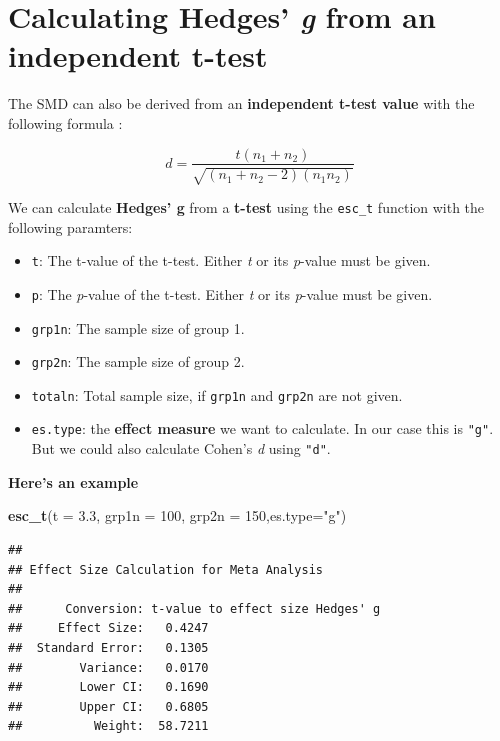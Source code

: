 \documentclass[]{book}
\newenvironment{Shaded}{\begin{snugshade}}{\end{snugshade}}
\newcommand{\DataTypeTok}[1]{\textcolor[rgb]{0.13,0.29,0.53}{#1}}
\newcommand{\DecValTok}[1]{\textcolor[rgb]{0.00,0.00,0.81}{#1}}
\newcommand{\FloatTok}[1]{\textcolor[rgb]{0.00,0.00,0.81}{#1}}
\newcommand{\KeywordTok}[1]{\textcolor[rgb]{0.13,0.29,0.53}{\textbf{#1}}}
\newcommand{\NormalTok}[1]{#1}
\newcommand{\StringTok}[1]{\textcolor[rgb]{0.31,0.60,0.02}{#1}}
\providecommand{\tightlist}{%
  \setlength{\itemsep}{0pt}\setlength{\parskip}{0pt}}
\begin{document}
\hypertarget{g}{%
\section{\texorpdfstring{Calculating Hedges' \emph{g} from an independent t-test}{Calculating Hedges' g from an independent t-test}}\label{g}}

The SMD can also be derived from an \textbf{independent t-test value} with the following formula \citep{thalheimer2002calculate}:

\[d = \frac {t(n_1+n_2)}{\sqrt{(n_1+n_2-2)(n_1n_2)}}\]

We can calculate \textbf{Hedges' g} from a \textbf{t-test} using the \texttt{esc\_t} function with the following paramters:

\begin{itemize}
\tightlist
\item
  \texttt{t}: The t-value of the t-test. Either \emph{t} or its \emph{p}-value must be given.
\item
  \texttt{p}: The \emph{p}-value of the t-test. Either \emph{t} or its \emph{p}-value must be given.
\item
  \texttt{grp1n}: The sample size of group 1.
\item
  \texttt{grp2n}: The sample size of group 2.
\item
  \texttt{totaln}: Total sample size, if \texttt{grp1n} and \texttt{grp2n} are not given.
\item
  \texttt{es.type}: the \textbf{effect measure} we want to calculate. In our case this is \texttt{"g"}. But we could also calculate Cohen's \emph{d} using \texttt{"d"}.
\end{itemize}

\textbf{Here's an example}

\begin{Shaded}
\begin{Highlighting}[]
\KeywordTok{esc_t}\NormalTok{(}\DataTypeTok{t =} \FloatTok{3.3}\NormalTok{, }\DataTypeTok{grp1n =} \DecValTok{100}\NormalTok{, }\DataTypeTok{grp2n =} \DecValTok{150}\NormalTok{,}\DataTypeTok{es.type=}\StringTok{"g"}\NormalTok{)}
\end{Highlighting}
\end{Shaded}

\begin{verbatim}
## 
## Effect Size Calculation for Meta Analysis
## 
##      Conversion: t-value to effect size Hedges' g
##     Effect Size:   0.4247
##  Standard Error:   0.1305
##        Variance:   0.0170
##        Lower CI:   0.1690
##        Upper CI:   0.6805
##          Weight:  58.7211
\end{verbatim}
\end{document}
